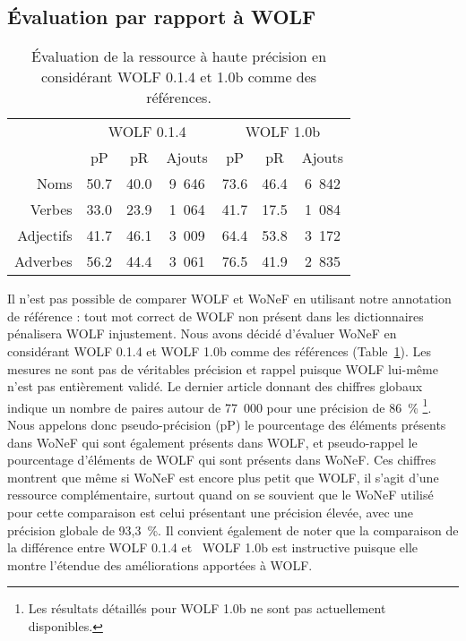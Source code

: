 \subsection{Évaluation par rapport à WOLF}
\label{subsec:vswolf}

\begin{table}[ht]
\centering
\begin{tabular}{rccc|ccc}
  \toprule
             & \multicolumn{3}{c}{WOLF 0.1.4}    & \multicolumn{3}{c}{WOLF 1.0b} \\
             &   pP      &    pR     & Ajouts    &     pP    &    pR    & Ajouts \\
  Noms       & 50.7     & 40.0     & 9~646     & 73.6     & 46.4    & 6~842  \\
  Verbes     & 33.0     & 23.9     & 1~064     & 41.7     & 17.5    & 1~084  \\
  Adjectifs  & 41.7     & 46.1     & 3~009     & 64.4     & 53.8    & 3~172  \\
  Adverbes   & 56.2     & 44.4     & 3~061     & 76.5     & 41.9    & 2~835  \\ 
  \bottomrule
\end{tabular}
\caption{\label{table:wolfcomparison}Évaluation de la ressource à haute précision en considérant WOLF 0.1.4 et 1.0b comme des références.}
\end{table}


Il n'est pas possible de comparer WOLF et WoNeF en utilisant notre annotation
de référence : tout mot correct de WOLF non présent dans les dictionnaires
pénalisera WOLF injustement. Nous avons décidé d'évaluer WoNeF en considérant
WOLF 0.1.4 et WOLF 1.0b comme des références
(Table~\ref{table:wolfcomparison}). Les mesures ne sont pas de véritables
précision et rappel puisque WOLF lui-même n'est pas entièrement validé. Le
dernier article donnant des chiffres globaux \citep{sagot2012automatic} indique
un nombre de paires autour de 77~000 pour une précision de 86~\% \footnote{Les
résultats détaillés pour WOLF 1.0b ne sont pas actuellement disponibles.}. Nous
appelons donc pseudo-précision (pP) le pourcentage des éléments présents dans
WoNeF qui sont également présents dans WOLF, et pseudo-rappel le pourcentage
d'éléments de WOLF qui sont présents dans WoNeF.  Ces chiffres montrent que
même si WoNeF est encore plus petit que WOLF, il s'agit d'une ressource
complémentaire, surtout quand on se souvient que le WoNeF utilisé pour cette
comparaison est celui présentant une précision élevée, avec une précision
globale de 93,3~\%. Il convient également de noter que la comparaison de la
différence entre WOLF 0.1.4 et \ WOLF 1.0b est instructive puisque elle montre
l'étendue des améliorations apportées à WOLF.

